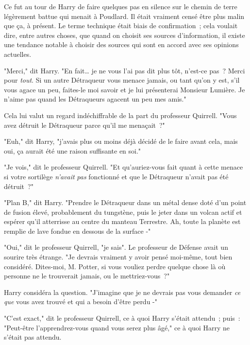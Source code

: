 Ce fut au tour de Harry de faire quelques pas en silence sur le chemin de terre légèrement battue qui menait à Poudlard. Il était vraiment censé être plus malin que ça, à présent. Le terme technique était biais de confirmation~; cela voulait dire, entre autres choses, que quand on choisit ses sources d'information, il existe une tendance notable à choisir des sources qui sont en accord avec ses opinions actuelles.

"Merci," dit Harry. "En fait… je ne vous l'ai pas dit plus tôt, n'est-ce pas~? Merci pour \emph{tout}. Si un autre Détraqueur vous menace jamais, ou tant qu'on y est, s'il vous agace un peu, faites-le moi savoir et je lui présenterai Monsieur Lumière. Je n'aime pas quand les Détraqueurs agacent un peu mes amis."

Cela lui valut un regard indéchiffrable de la part du professeur Quirrell. "Vous avez détruit le Détraqueur parce qu'il me menaçait~?"

"Euh," dit Harry, "j'avais plus ou moins déjà décidé de le faire avant cela, mais oui, ça aurait été une raison suffisante en soi."

"Je vois," dit le professeur Quirrell. "Et qu'auriez-vous fait quant à cette menace si votre sortilège \emph{n'avait} \emph{pas} fonctionné et que le Détraqueur n'avait pas été détruit~?"

"Plan B," dit Harry. "Prendre le Détraqueur dans un métal dense doté d'un point de fusion élevé, probablement du tungstène, puis le jeter dans un volcan actif et espérer qu'il atterrisse au centre du manteau Terrestre. Ah, toute la planète est remplie de lave fondue en dessous de la surface -"

"Oui," dit le professeur Quirrell, "je sais". Le professeur de Défense avait un sourire très étrange. "Je devrais vraiment y avoir pensé moi-même, tout bien considéré. Dites-moi, M. Potter, si vous vouliez perdre quelque chose là où personne ne le trouverait jamais, ou le mettriez-vous~?"

Harry considéra la question. "J'imagine que je ne devrais pas vous demander \emph{ce que} vous avez trouvé et qui a besoin d'être perdu -"

"C'est exact," dit le professeur Quirrell, ce à quoi Harry s'était attendu~; puis~: "Peut-être l'apprendrez-vous quand vous serez plus âgé," ce à quoi Harry ne s'était pas attendu.

